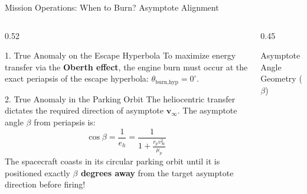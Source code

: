\documentclass[aspectratio=169, 10pt]{beamer}
\begin{document}
\begin{frame}{Mission Operations: When to Burn? Asymptote Alignment}
    \begin{columns}[t]
        \begin{column}{0.52\textwidth}
            \begin{block}{1. True Anomaly on the Escape Hyperbola}
                \scriptsize
                To maximize energy transfer via the \textbf{Oberth effect}, the engine burn must occur at the exact periapsis of the escape hyperbola: $\theta_{\text{burn,hyp}} = 0^\circ$.
            \end{block}

            \vspace{-0.1cm}

            \begin{block}{2. True Anomaly in the Parking Orbit}
                \scriptsize
                The heliocentric transfer dictates the required direction of asymptote $\mathbf{v}_\infty$. The asymptote angle $\beta$ from periapsis is:
                \vspace{-0.08cm}
                \begin{equation*}
                    \cos\beta = \frac{1}{e_h} = \frac{1}{1 + \frac{r_p v_\infty^2}{\mu_p}}
                \end{equation*}
                \vspace{-0.1cm}
                The spacecraft coasts in its circular parking orbit until it is positioned exactly \textbf{$\beta$ degrees away} from the target asymptote direction before firing!
            \end{block}
        \end{column}

        \begin{column}{0.45\textwidth}
            \begin{block}{Asymptote Angle Geometry ($\beta$)}
                \centering
\end{block}
\end{column}
\end{columns}
\end{frame}
\end{document}
